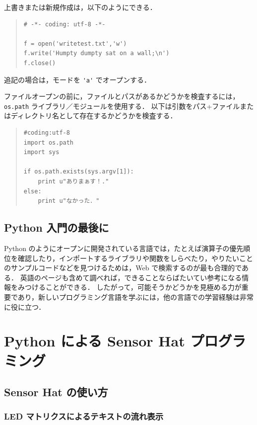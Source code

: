 \documentclass[11pt,a4,epsf]{report}
\begin{document}
上書きまたは新規作成は，以下のようにできる．
\begin{quote}
\small
\begin{verbatim}
# -*- coding: utf-8 -*-

f = open('writetest.txt','w')
f.write('Humpty dumpty sat on a wall;\n')
f.close()
\end{verbatim}
\end{quote}
追記の場合は，モードを \verb+'a'+ でオープンする．

ファイルオープンの前に，ファイルとパスがあるかどうかを検査するには，\verb+os.path+ ライブラリ／モジュールを使用する．
以下は引数をパス+ファイルまたはディレクトリ名として存在するかどうかを検査する．
\begin{quote}
\small
\begin{verbatim}
#coding:utf-8
import os.path
import sys

if os.path.exists(sys.argv[1]):
    print u"ありまぁす！."
else:
    print u"なかった．"
\end{verbatim}
\end{quote}


\section{Python 入門の最後に}

Python のようにオープンに開発されている言語では，たとえば演算子の優先順位を確認したり，インポートするライブラリや関数をしらべたり，やりたいことのサンプルコードなどを見つけるためは，Web で検索するのが最も合理的である．
英語のページも含めて調べれば，できることならばたいてい参考になる情報をみつけることができる．
したがって，可能そうかどうかを見極める力が重要であり，新しいプログラミング言語を学ぶには，他の言語での学習経験は非常に役に立つ．


\chapter{Python による Sensor Hat プログラミング}

\section{Sensor Hat の使い方}

\subsection{LED マトリクスによるテキストの流れ表示}
\end{document}
